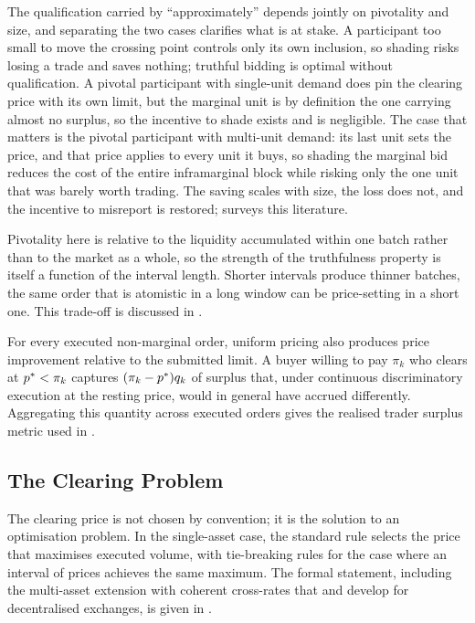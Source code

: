 The qualification carried by ``approximately'' depends jointly on
pivotality and size, and separating the two cases clarifies what is at
stake. A participant too small to move the crossing point controls only
its own inclusion, so shading risks losing a trade and saves nothing;
truthful bidding is optimal without qualification. A pivotal participant
with single-unit demand does pin the clearing price with its own limit,
but the marginal unit is by definition the one carrying almost no
surplus, so the incentive to shade exists and is negligible. The case
that matters is the pivotal participant with multi-unit demand: its last
unit sets the price, and that price applies to every unit it buys, so
shading the marginal bid reduces the cost of the entire inframarginal
block while risking only the one unit that was barely worth trading. The
saving scales with size, the loss does not, and the incentive to
misreport is restored; \citet{klemperer1999auction} surveys this
literature.

Pivotality here is relative to the liquidity accumulated within one
batch rather than to the market as a whole, so the strength of the
truthfulness property is itself a function of the interval length.
Shorter intervals produce thinner batches, the same order that is atomistic
in a long window can be price-setting in a short one. 
This trade-off is discussed in .

For every executed non-marginal order, uniform pricing also produces
price improvement relative to the submitted limit. A buyer willing to
pay $\pi_k$ who clears at $p^{\ast} < \pi_k$ captures $(\pi_k - p^{\ast}) q_k$
of surplus that, under continuous discriminatory execution at the
resting price, would in general have accrued differently. Aggregating
this quantity across executed orders gives the realised trader surplus
metric used in .

\subsection{The Clearing Problem}

The clearing price is not chosen by convention; it is the solution to an
optimisation problem. In the single-asset case, the standard rule
selects the price that maximises executed volume, with tie-breaking
rules for the case where an interval of prices achieves the same
maximum. The formal statement, including the multi-asset extension with
coherent cross-rates that
\citet{walther2021multitoken} and \citet{ramsay2023speedex} develop for
decentralised exchanges, is given in .


